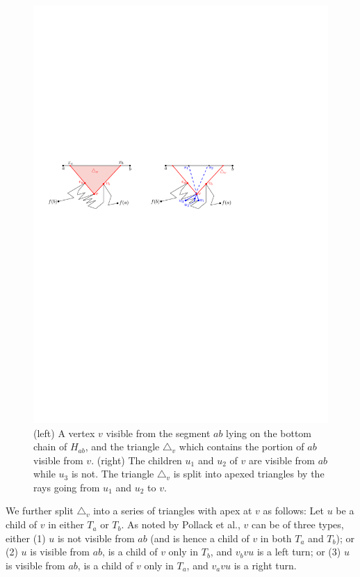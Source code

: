 \documentclass[a4paper]{article}
\begin{document}
\begin{figure}[tb]
\centering
\includegraphics{img/HourglassCover.pdf}

\caption{\small (left) A vertex $v$ visible from the segment $ab$ lying on the bottom chain of $H_{ab}$, and the triangle $\triangle_v$ which contains the portion of $ab$ visible from $v$. (right) The children $u_1$ and $u_2$ of $v$ are visible from $ab$ while $u_3$ is not. The triangle  $\triangle_v$ is split into apexed triangles by the rays going from $u_1$ and $u_2$ to $v$. }
\label{fig:Hourglass Cover}
\end{figure}

We further split $\triangle_v$ into a series of triangles with apex at $v$ as follows: 
Let $u$ be a child of $v$ in either $T_a$ or $T_b$. As noted by Pollack et al., $v$ can be of three types, either (1) $u$ is not visible from $ab$ (and is hence a child of $v$ in both $T_a$ and $T_b$); or (2) $u$ is visible from $ab$, is a child of $v$ only in $T_b$, and $v_b v u$ is a left turn; or (3) $u$ is visible from $ab$, is a child of $v$ only in $T_a$, and $v_a v u$ is a right turn.
\end{document}
